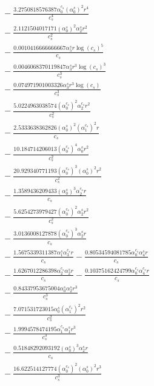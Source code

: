 \documentclass[10pt]{article}
\begin{document}
\begin{align*}
&{}  - \frac{3.2750818576387 \alpha_{0}^{c_s} \left(\alpha_{0}^s\right)^{2} r^{4}}{c_{s}^{4}} \\
&{}  - \frac{2.1121504017171 \left(\alpha_{0}^s\right)^{2} \alpha_{2}^s r^{2}}{c_{s}^{2}} \\
&{}  - \frac{0.0010416666666667 \alpha_{5}^s r \log{\left(c_{s} \right)}^{5}}{c_{s}} \\
&{}  - \frac{0.0046068370119847 \alpha_{3}^s r^{3} \log{\left(c_{s} \right)}^{3}}{c_{s}^{3}} \\
&{}  - \frac{0.074971901003326 \alpha_{3}^s r^{3} \log{\left(c_{s} \right)}}{c_{s}^{3}} \\
&{}  - \frac{5.0224963038574 \left(\alpha_{0}^{c_s}\right)^{2} \alpha_{2}^{c_s} r^{2}}{c_{s}^{2}} \\
&{}  - \frac{2.5333638362826 \left(\alpha_{0}^s\right)^{2} \left(\alpha_{1}^{c_s}\right)^{2} r}{c_{s}} \\
&{}  - \frac{10.184714206013 \left(\alpha_{0}^{c_s}\right)^{4} \alpha_{0}^s r^{2}}{c_{s}^{2}} \\
&{}  - \frac{20.929340771193 \left(\alpha_{0}^{c_s}\right)^{3} \left(\alpha_{0}^s\right)^{2} r^{2}}{c_{s}^{2}} \\
&{}  - \frac{1.3589436209433 \left(\alpha_{0}^s\right)^{3} \alpha_{2}^{c_s} r}{c_{s}} \\
&{}  - \frac{5.6254273979427 \left(\alpha_{0}^{c_s}\right)^{2} \alpha_{2}^s r^{2}}{c_{s}^{2}} \\
&{}  - \frac{3.0136008127878 \left(\alpha_{0}^{c_s}\right)^{3} \alpha_{2}^s r}{c_{s}} \\
&{}  - \frac{1.5675339311387 \alpha_{1}^s \alpha_{3}^{c_s} r}{c_{s}} - \frac{0.80534594081785 \alpha_{0}^{c_s} \alpha_{4}^s r}{c_{s}} \\
&{}  - \frac{1.6267012286398 \alpha_{2}^{c_s} \alpha_{2}^s r}{c_{s}} - \frac{0.10375162424799 \alpha_{0}^{c_s} \alpha_{4}^{c_s} r}{c_{s}} \\
&{}  - \frac{0.84337953675004 \alpha_{0}^s \alpha_{2}^s r^{3}}{c_{s}^{3}} \\
&{}  - \frac{7.071531723015 \alpha_{0}^s \left(\alpha_{1}^{c_s}\right)^{2} r^{2}}{c_{s}^{2}} \\
&{}  - \frac{1.9994578474195 \alpha_{1}^{c_s} \alpha_{1}^s r^{3}}{c_{s}^{3}} \\
&{}  - \frac{0.51848292093192 \left(\alpha_{0}^s\right)^{3} \alpha_{2}^s r}{c_{s}} \\
&{}  - \frac{16.622514127774 \left(\alpha_{0}^{c_s}\right)^{2} \left(\alpha_{0}^s\right)^{2} r^{3}}{c_{s}^{3}} \\

\end{align*}
\end{document}
